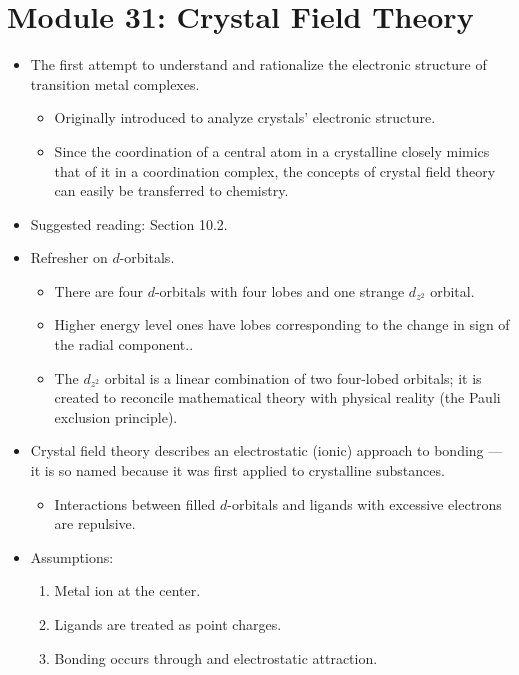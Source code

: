 \documentclass[../notes.tex]{subfiles}
\begin{document}
\section{Module 31: Crystal Field Theory}
\begin{itemize}
    \item The first attempt to understand and rationalize the electronic structure of transition metal complexes.
    \begin{itemize}
        \item Originally introduced to analyze crystals' electronic structure.
        \item Since the coordination of a central atom in a crystalline closely mimics that of it in a coordination complex, the concepts of crystal field theory can easily be transferred to chemistry.
    \end{itemize}
    \item Suggested reading: \textcite{bib:MiesslerFischerTarr} Section 10.2.
    \item Refresher on $d$-orbitals.
    \begin{itemize}
        \item There are four $d$-orbitals with four lobes and one strange $d_{z^2}$ orbital.
        \item Higher energy level ones have lobes corresponding to the change in sign of the radial component..
        \item The $d_{z^2}$ orbital is a linear combination of two four-lobed orbitals; it is created to reconcile mathematical theory with physical reality (the Pauli exclusion principle).
    \end{itemize}
    \item Crystal field theory describes an electrostatic (ionic) approach to bonding --- it is so named because it was first applied to crystalline substances.
    \begin{itemize}
        \item Interactions between filled $d$-orbitals and ligands with excessive electrons are repulsive.
    \end{itemize}
    \item Assumptions:
    \begin{enumerate}
        \item Metal ion at the center.
        \item Ligands are treated as point charges.
        \item Bonding occurs through  and  electrostatic attraction.

\end{enumerate}
\end{itemize}
\end{document}
